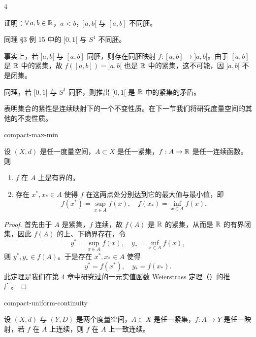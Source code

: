 \begin{sourceexample}{4}

证明：$\forall\,a,b\in\mathbb{R}$，$a<b$，$]a,b[$ 与 $[a,b]$ 不同胚。

同理 §3 例 15 中的 $[0,1[$ 与 $S^1$ 不同胚。

事实上，若 $]a,b[$ 与 $[a,b]$ 同胚，则存在同胚映射 $f:[a,b]\to]a,b[$。由于 $[a,b]$ 是 $\mathbb{R}$ 中的紧集，故 $f([a,b])=]a,b[$ 也是 $\mathbb{R}$ 中的紧集，这不可能，因 $]a,b[$ 不是闭集。

同理，若 $[0,1[$ 与 $S^1$ 同胚，则推出 $[0,1[$ 是 $\mathbb{R}$ 中的紧集的矛盾。

\end{sourceexample}

表明集合的紧性是连续映射下的一个不变性质。在下一节我们将研究度量空间的其他的不变性质。

\begin{mythm}{}{compact-max-min}

设 $(X,d)$ 是任一度量空间，$A\subset X$ 是任一紧集，$f:A\to\mathbb{R}$ 是任一连续函数。则

\begin{enumerate}[label=\arabic{enumi})]
\item $f$ 在 $A$ 上是有界的。
\item 存在 $x^*,x_*\in A$ 使得 $f$ 在这两点处分别达到它的最大值与最小值，即
\[f(x^*)=\sup_{x\in A}f(x),\quad f(x_*)=\inf_{x\in A}f(x).\]
\end{enumerate}

\end{mythm}

\begin{proof}

首先由于 $A$ 是紧集，$f$ 连续，故 $f(A)$ 是 $\mathbb{R}$ 的紧集，从而是 $\mathbb{R}$ 的有界闭集，因此 $f(A)$ 的上、下确界存在，令
\[y^*=\sup_{x\in A}f(x),\quad y_*=\inf_{x\in A}f(x),\]
则 $y^*,y_*\in f(A)$。于是存在 $x^*,x_*\in A$ 使得
\[y^*=f(x^*),\quad y_*=f(x_*).\]
此定理是我们在第 4 章中研究过的一元实值函数 Weierstrass 定理（）的推广。

\end{proof}

\begin{mythm}{}{compact-uniform-continuity}

设 $(X,d)$ 与 $(Y,D)$ 是两个度量空间，$A\subset X$ 是任一紧集，$f:A\to Y$ 是任一映射，若 $f$ 在 $A$ 上连续，则 $f$ 在 $A$ 上一致连续。

\end{mythm}


